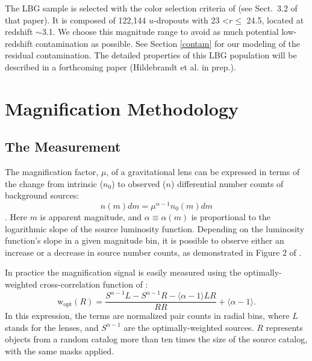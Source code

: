 The LBG sample is selected with the color selection criteria of \citet{Hildebrandt09a} (see Sect.~3.2 of that paper). It is composed of 122,144 $u$-dropouts with 23 \textless $r \leq$ 24.5, located at redshift $\sim$3.1. We choose this magnitude range to avoid as much potential low-redshift contamination as possible. See Section \ref{contam} for our modeling of the residual contamination. The detailed properties of this LBG population will be described in a forthcoming paper (Hildebrandt et al. in prep.).


\section{Magnification Methodology}
\label{method}

\subsection{The Measurement}

The magnification factor, $\mu$, of a gravitational lens can be expressed in terms of the change from intrinsic ($n_0$) to observed ($n$) differential number counts of background sources:
\begin{equation}
n(m)dm = \mu^{\alpha-1} n_0(m)dm 
\end{equation}
\citep{Narayan89}. Here $m$ is apparent magnitude, and $\alpha \equiv \alpha(m)$ is proportional to the logarithmic slope of the source luminosity function. Depending on the luminosity function's slope in a given magnitude bin, it is possible to observe either an increase or a decrease in source number counts, as demonstrated in Figure 2 of \citet{Ford12}. 

In practice the magnification signal is easily measured using the optimally-weighted cross-correlation function of \citet{Menard03}:
\begin{equation}
\mathrm{w}_{\mathrm{opt}}(R)=\frac{S^{\alpha-1} L - S^{\alpha-1} R - \langle \alpha-1 \rangle LR}{RR} + \langle \alpha-1 \rangle.
\end{equation}
In this expression, the terms are normalized pair counts in radial bins, where $L$ stands for the lenses, and $S^{\alpha-1}$ are the optimally-weighted sources. $R$ represents objects from a random catalog more than ten times the size of the source catalog, with the same masks applied.


